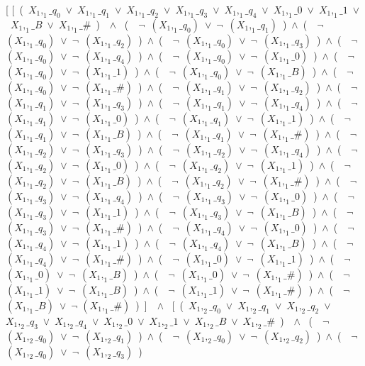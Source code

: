 ﻿\documentclass[a4paper,10pt]{article}
\begin{document}
[	[\ (\ $X_1,_1\_q_0$\ $\vee$\ $X_1,_1\_q_1$\ $\vee$\ $X_1,_1\_q_2$\ $\vee$\ $X_1,_1\_q_3$\ $\vee$\ $X_1,_1\_q_4$\ $\vee$\ $X_1,_1\_0$\ $\vee$\ $X_1,_1\_1$\ $\vee$\ $X_1,_1\_B$\ $\vee$\ $X_1,_1\_\#$\ )\ \ $\wedge$ \ (\ \ $\neg$\ $(X_1,_1\_q_0)$\ $\vee$\ $\neg$\ $(X_1,_1\_q_1)$\ )\ $\wedge$\ (\ \ $\neg$\ $(X_1,_1\_q_0)$\ $\vee$\ $\neg$\ $(X_1,_1\_q_2)$\ )\ $\wedge$\ (\ \ $\neg$\ $(X_1,_1\_q_0)$\ $\vee$\ $\neg$\ $(X_1,_1\_q_3)$\ )\ $\wedge$\ (\ \ $\neg$\ $(X_1,_1\_q_0)$\ $\vee$\ $\neg$\ $(X_1,_1\_q_4)$\ )\ $\wedge$\ (\ \ $\neg$\ $(X_1,_1\_q_0)$\ $\vee$\ $\neg$\ $(X_1,_1\_0)$\ )\ $\wedge$\ (\ \ $\neg$\ $(X_1,_1\_q_0)$\ $\vee$\ $\neg$\ $(X_1,_1\_1)$\ )\ $\wedge$\ (\ \ $\neg$\ $(X_1,_1\_q_0)$\ $\vee$\ $\neg$\ $(X_1,_1\_B)$\ )\ $\wedge$\ (\ \ $\neg$\ $(X_1,_1\_q_0)$\ $\vee$\ $\neg$\ $(X_1,_1\_\#)$\ )\ $\wedge$\ (\ \ $\neg$\ $(X_1,_1\_q_1)$\ $\vee$\ $\neg$\ $(X_1,_1\_q_2)$\ )\ $\wedge$\ (\ \ $\neg$\ $(X_1,_1\_q_1)$\ $\vee$\ $\neg$\ $(X_1,_1\_q_3)$\ )\ $\wedge$\ (\ \ $\neg$\ $(X_1,_1\_q_1)$\ $\vee$\ $\neg$\ $(X_1,_1\_q_4)$\ )\ $\wedge$\ (\ \ $\neg$\ $(X_1,_1\_q_1)$\ $\vee$\ $\neg$\ $(X_1,_1\_0)$\ )\ $\wedge$\ (\ \ $\neg$\ $(X_1,_1\_q_1)$\ $\vee$\ $\neg$\ $(X_1,_1\_1)$\ )\ $\wedge$\ (\ \ $\neg$\ $(X_1,_1\_q_1)$\ $\vee$\ $\neg$\ $(X_1,_1\_B)$\ )\ $\wedge$\ (\ \ $\neg$\ $(X_1,_1\_q_1)$\ $\vee$\ $\neg$\ $(X_1,_1\_\#)$\ )\ $\wedge$\ (\ \ $\neg$\ $(X_1,_1\_q_2)$\ $\vee$\ $\neg$\ $(X_1,_1\_q_3)$\ )\ $\wedge$\ (\ \ $\neg$\ $(X_1,_1\_q_2)$\ $\vee$\ $\neg$\ $(X_1,_1\_q_4)$\ )\ $\wedge$\ (\ \ $\neg$\ $(X_1,_1\_q_2)$\ $\vee$\ $\neg$\ $(X_1,_1\_0)$\ )\ $\wedge$\ (\ \ $\neg$\ $(X_1,_1\_q_2)$\ $\vee$\ $\neg$\ $(X_1,_1\_1)$\ )\ $\wedge$\ (\ \ $\neg$\ $(X_1,_1\_q_2)$\ $\vee$\ $\neg$\ $(X_1,_1\_B)$\ )\ $\wedge$\ (\ \ $\neg$\ $(X_1,_1\_q_2)$\ $\vee$\ $\neg$\ $(X_1,_1\_\#)$\ )\ $\wedge$\ (\ \ $\neg$\ $(X_1,_1\_q_3)$\ $\vee$\ $\neg$\ $(X_1,_1\_q_4)$\ )\ $\wedge$\ (\ \ $\neg$\ $(X_1,_1\_q_3)$\ $\vee$\ $\neg$\ $(X_1,_1\_0)$\ )\ $\wedge$\ (\ \ $\neg$\ $(X_1,_1\_q_3)$\ $\vee$\ $\neg$\ $(X_1,_1\_1)$\ )\ $\wedge$\ (\ \ $\neg$\ $(X_1,_1\_q_3)$\ $\vee$\ $\neg$\ $(X_1,_1\_B)$\ )\ $\wedge$\ (\ \ $\neg$\ $(X_1,_1\_q_3)$\ $\vee$\ $\neg$\ $(X_1,_1\_\#)$\ )\ $\wedge$\ (\ \ $\neg$\ $(X_1,_1\_q_4)$\ $\vee$\ $\neg$\ $(X_1,_1\_0)$\ )\ $\wedge$\ (\ \ $\neg$\ $(X_1,_1\_q_4)$\ $\vee$\ $\neg$\ $(X_1,_1\_1)$\ )\ $\wedge$\ (\ \ $\neg$\ $(X_1,_1\_q_4)$\ $\vee$\ $\neg$\ $(X_1,_1\_B)$\ )\ $\wedge$\ (\ \ $\neg$\ $(X_1,_1\_q_4)$\ $\vee$\ $\neg$\ $(X_1,_1\_\#)$\ )\ $\wedge$\ (\ \ $\neg$\ $(X_1,_1\_0)$\ $\vee$\ $\neg$\ $(X_1,_1\_1)$\ )\ $\wedge$\ (\ \ $\neg$\ $(X_1,_1\_0)$\ $\vee$\ $\neg$\ $(X_1,_1\_B)$\ )\ $\wedge$\ (\ \ $\neg$\ $(X_1,_1\_0)$\ $\vee$\ $\neg$\ $(X_1,_1\_\#)$\ )\ $\wedge$\ (\ \ $\neg$\ $(X_1,_1\_1)$\ $\vee$\ $\neg$\ $(X_1,_1\_B)$\ )\ $\wedge$\ (\ \ $\neg$\ $(X_1,_1\_1)$\ $\vee$\ $\neg$\ $(X_1,_1\_\#)$\ )\ $\wedge$\ (\ \ $\neg$ $(X_1,_1\_B)$\ $\vee$\ $\neg$ $(X_1,_1\_\#)$\ )\ ]\ \ $\wedge$ \ [\ (\ $X_1,_2\_q_0$\ $\vee$\ $X_1,_2\_q_1$\ $\vee$\ $X_1,_2\_q_2$\ $\vee$\ $X_1,_2\_q_3$\ $\vee$\ $X_1,_2\_q_4$\ $\vee$\ $X_1,_2\_0$\ $\vee$\ $X_1,_2\_1$\ $\vee$\ $X_1,_2\_B$\ $\vee$\ $X_1,_2\_\#$\ )\ \ $\wedge$ \ (\ \ $\neg$\ $(X_1,_2\_q_0)$\ $\vee$\ $\neg$\ $(X_1,_2\_q_1)$\ )\ $\wedge$\ (\ \ $\neg$\ $(X_1,_2\_q_0)$\ $\vee$\ $\neg$\ $(X_1,_2\_q_2)$\ )\ $\wedge$\ (\ \ $\neg$\ $(X_1,_2\_q_0)$\ $\vee$\ $\neg$\ $(X_1,_2\_q_3)$\ )\ 
\end{document}
